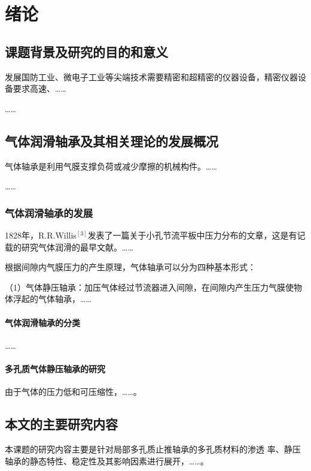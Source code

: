 
\chapter{绪论}

\section{课题背景及研究的目的和意义}

发展国防工业、微电子工业等尖端技术需要精密和超精密的仪器设备，精密仪器设备要求高速、\dots\dots

\dots\dots

\section{气体润滑轴承及其相关理论的发展概况}

气体轴承是利用气膜支撑负荷或减少摩擦的机械构件。\dots\dots

\dots\dots

\subsection{气体润滑轴承的发展}

1828年，R.R.Willis$^{[3]}$发表了一篇关于小孔节流平板中压力分布的文章，这是有记载的研究气体润滑的最早文献。\dots\dots

根据间隙内气膜压力的产生原理，气体轴承可以分为四种基本形式：

（1）气体静压轴承：加压气体经过节流器进入间隙，在间隙内产生压力气膜使物体浮起的气体轴承，\dots\dots

\subsubsection{气体润滑轴承的分类}

\dots\dots

\subsubsection{多孔质气体静压轴承的研究}

由于气体的压力低和可压缩性，\dots\dots。

\section{本文的主要研究内容}

本课题的研究内容主要是针对局部多孔质止推轴承的多孔质材料的渗透
率、静压轴承的静态特性、稳定性及其影响因素进行展开，\dots\dots。
